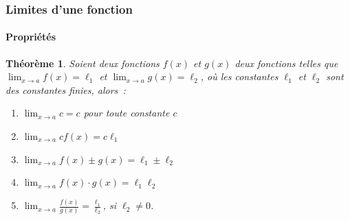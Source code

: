 \documentclass[10pt,notheorems]{beamer}
\theoremstyle{plain}
\newtheorem{theorem}{Théorème}
\theoremstyle{definition} %
\begin{document}
\begin{frame}
  \frametitle{Limites d'une fonction}
  \framesubtitle{Propriétés}

  \begin{theorem}
    Soient deux fonctions $f(x)$ et $g(x)$ deux fonctions telles que $\lim_{x\rightarrow a}f(x) = \ell_1$ et $\lim_{x\rightarrow a}g(x) = \ell_2$, où les constantes $\ell_1$ et $\ell_2$ sont des constantes finies, alors~:\newline
    \begin{enumerate}

    \item $\lim_{x\rightarrow a} c = c$  pour toute constante $c$\newline

    \item $\lim_{x\rightarrow a} c f(x) = c\ell_1$\newline

    \item $\lim_{x\rightarrow a} f(x)\pm g(x) = \ell_1\pm\ell_2$\newline

    \item $\lim_{x\rightarrow a} f(x)\cdot g(x) = \ell_1\ell_2$\newline

    \item $\lim_{x\rightarrow a} \frac{f(x)}{g(x)} = \frac{\ell_1}{\ell_2}$, si $\ell_2\neq 0$.

    \end{enumerate}
  \end{theorem}

\end{frame}
\end{document}

